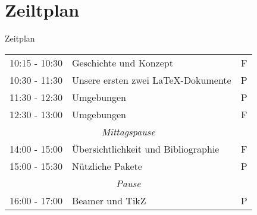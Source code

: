 \documentclass[11pt]{beamer}
\begin{document}
\section{Zeiltplan}
\begin{frame}{Zeitplan}
\begin{tabular}{c|l|c}
10:15 - 10:30 & Geschichte und Konzept & F\\
10:30 - 11:30 & Unsere ersten zwei \LaTeX -Dokumente & P\\
11:30 - 12:30 & Umgebungen & P\\
12:30 - 13:00 & Umgebungen & F\\
\multicolumn{3}{c}{\textit{Mittagspause}}\\
14:00 - 15:00 & Übersichtlichkeit und Bibliographie & F\\
15:00 - 15:30 & Nützliche Pakete & P\\
\multicolumn{3}{c}{\textit{Pause}}\\
16:00 - 17:00 & Beamer und TikZ & P
\end{tabular}
\end{frame}
\end{document}
